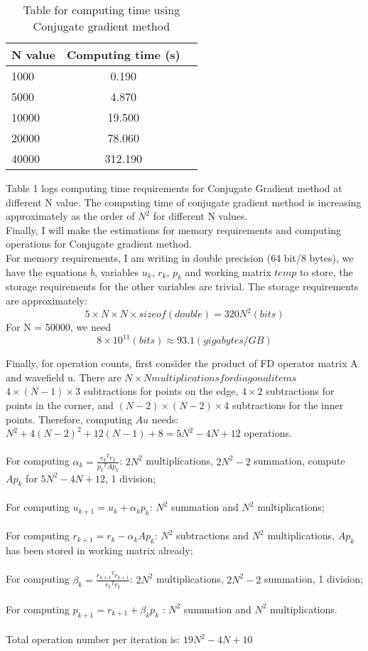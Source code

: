 \documentclass[12pt]{article}
\begin{document}
\begin{table}[H]
	\centering
	\label{tab:cg}
	\begin{tabular}{lcr}
	\bfseries N value & Computing time (s)\\ \hline
	1000 & 0.190\\
	5000 & 4.870\\
	10000 & 19.500\\
	20000 & 78.060\\
	40000 & 312.190\\
	\end{tabular}
	\caption[This is optional caption, without reference]{Table for computing time using Conjugate gradient method}
\end{table}
Table 1 logs computing time requirements for Conjugate Gradient method at different N value. The computing time of conjugate gradient method is increasing approximately as the order of $N^2$ for different N values.\\

Finally, I will make the estimations for memory requirements and computing operations for Conjugate gradient method.\\

For memory requirements, I am writing in double precision (64 bit/8 bytes), we have the equations $b$,  variables $u_k$, $r_k$, $p_k$ and working matrix $temp$ to store, the storage requirements for the other variables are trivial.
The storage requirements are approximately:
$$5 \times N \times N \times sizeof(double) = 320N^2 (bits)$$
For N = 50000, we need $$8\times {10}^{11} (bits) \approx 93.1 (gigabytes/GB)$$

Finally, for operation counts, first consider the product of FD operator matrix A and wavefield u. There are $N \times N multiplications for diagonal items$ $4\times(N-1)\times3$ subtractions for points on the edge, $4\times2$ subtractions for points in the corner, and $(N-2)\times(N-2)\times4$ subtractions for the inner points. Therefore, computing $Au$ needs: $N^2 + 4{(N-2)}^2 + 12(N-1) +8 = 5N^2-4N+12 $ operations.\\\\
For computing ${\alpha}_k = \frac{{r_k}^T r_k}{{p_k}^T Ap_k}$: $2N^2$ multiplications, $2N^2 - 2$ summation, compute $Ap_k$ for $5N^2 -4N+12$, 1 division;\\\\
For computing $u_{k+1} = u_k +{\alpha}_k p_k$: $N^2$ summation and $N^2$ multiplications;\\\\
For computing $r_{k+1} = r_k -{\alpha}_k Ap_k$: $N^2$ subtractions and $N^2$ multiplications, $Ap_k$ has been stored in working matrix already;\\\\
For computing ${\beta}_k = \frac{{r_{k+1}}^T{r_{k+1}}}{{r_k}^Tr_k}$: $2N^2$ multiplications, $2N^2 - 2$ summation, 1 division;\\\\
For computing $p_{k+1} = r_{k+1} + \beta_kp_k$ : $N^2$ summation and $N^2$ multiplications.\\\\
Total operation number per iteration is: $19N^2-4N+10$

%
%
%
\end{document}
